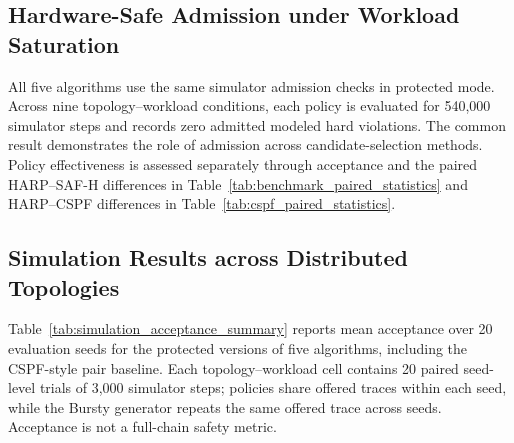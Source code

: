 \documentclass[final,5p]{elsarticle}
\newcommand{\rev}[1]{\textcolor{revisiongreen}{#1}}
\let\newrev\rev
\begin{document}
\subsection{\newrev{Hardware-Safe Admission under Workload Saturation}}
\newrev{All five algorithms use the same simulator admission checks in protected mode. Across nine topology--workload conditions, each policy is evaluated for 540,000 simulator steps and records zero admitted modeled hard violations. The common result demonstrates the role of admission across candidate-selection methods. Policy effectiveness is assessed separately through acceptance and the paired HARP--SAF-H differences in Table~\ref{tab:benchmark_paired_statistics} and HARP--CSPF differences in Table~\ref{tab:cspf_paired_statistics}.}



\subsection{\newrev{Simulation Results across Distributed Topologies}}
\label{subsec:simulation_results}
\newrev{Table~\ref{tab:simulation_acceptance_summary} reports mean acceptance over 20 evaluation seeds for the protected versions of five algorithms, including the CSPF-style pair baseline. Each topology--workload cell contains 20 paired seed-level trials of 3,000 simulator steps; policies share offered traces within each seed, while the Bursty generator repeats the same offered trace across seeds. Acceptance is not a full-chain safety metric.}
\end{document}
